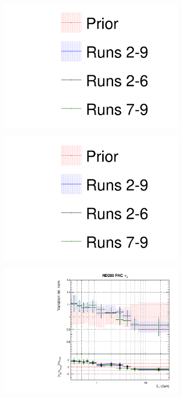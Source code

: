 \begin{figure}
\centering
\begin{subfigure}{0.3\textwidth}
  \centering
  \includegraphics[width=1.0\linewidth, trim={5mm  90mm 0mm 0mm}, clip]{figs/newolddatafits_leg}
\end{subfigure}
\begin{subfigure}{0.3\textwidth}
  \centering
  \includegraphics[width=1.0\linewidth, trim={5mm  0mm 0mm 95mm}, clip]{figs/newolddatafits_leg}
\end{subfigure}
\begin{subfigure}{0.45\textwidth}
  \centering
  \includegraphics[width=0.75\linewidth]{figs/newolddatafitsflux_0}

\end{subfigure}
\end{figure}
